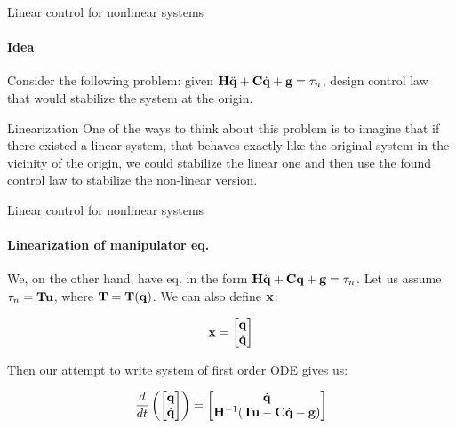 \documentclass{beamer}
\begin{document}
\begin{frame}{Linear control for nonlinear systems}
\framesubtitle{Idea}
\begin{flushleft}

Consider the following problem: given $\mathbf{H} \ddot{\mathbf{q}} + \mathbf{C} \dot{\mathbf{q}} + \mathbf{g} = \tau_n$, design control law that would stabilize the system at the origin.

\bigskip

\begin{block}{Linearization}
One of the ways to think about this problem is to imagine that if there existed a linear system, that behaves exactly like the original system in the vicinity of the origin, we could stabilize the linear one and then use the found control law to stabilize the non-linear version.
\end{block}


\end{flushleft}
\end{frame}





\begin{frame}{Linear control for nonlinear systems}
\framesubtitle{Linearization of manipulator eq.}
\begin{flushleft}

We, on the other hand, have eq. in the form $\mathbf{H} \ddot{\mathbf{q}} + \mathbf{C} \dot{\mathbf{q}} + \mathbf{g} = \tau_n$. Let us assume $\tau_n = \mathbf{T}\mathbf{u}$, where $\mathbf{T} = \mathbf{T}(\mathbf{q})$. We can also define $\mathbf{x}$:

\begin{equation}
    \mathbf{x} = \begin{bmatrix}
    \mathbf{q} \\ \dot{\mathbf{q}} \end{bmatrix}
\end{equation}

Then our attempt to write system of first order ODE gives us:

\begin{equation}
    \frac{d}{dt} 
    \left(
    \begin{bmatrix}
    \mathbf{q} \\ \dot{\mathbf{q}} 
    \end{bmatrix}
    \right)
    =
    \begin{bmatrix}
    \dot{\mathbf{q}}  \\ 
    \mathbf{H}^{-1} (\mathbf{T}\mathbf{u} -  \mathbf{C} \dot{\mathbf{q}} - \mathbf{g}) 
    \end{bmatrix}
\end{equation}

\end{flushleft}
\end{frame}
\end{document}
